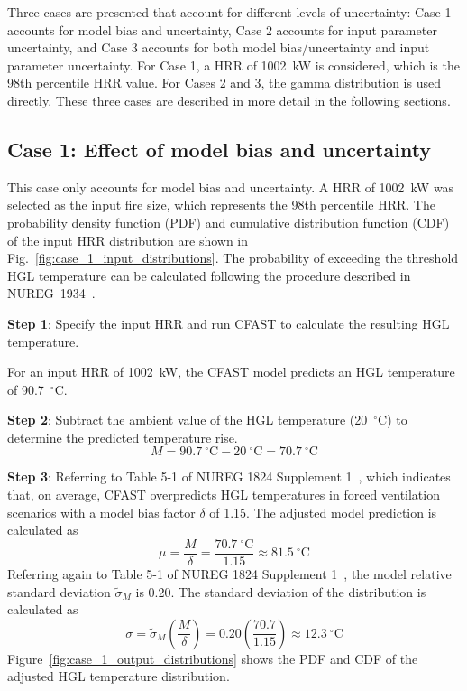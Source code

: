 \documentclass[12pt]{article}
\begin{document}
Three cases are presented that account for different levels of uncertainty: Case 1 accounts for model bias and uncertainty, Case 2 accounts for input parameter uncertainty, and Case 3 accounts for both model bias/uncertainty and input parameter uncertainty. For Case 1, a HRR of 1002~kW is considered, which is the 98th percentile HRR value. For Cases 2 and 3, the gamma distribution is used directly. These three cases are described in more detail in the following sections.



\clearpage


\subsection{Case 1: Effect of model bias and uncertainty}

This case only accounts for model bias and uncertainty. A HRR of 1002~kW was selected as the input fire size, which represents the 98th percentile HRR. The probability density function (PDF) and cumulative distribution function (CDF) of the input HRR distribution are shown in Fig.~\ref{fig:case_1_input_distributions}. The probability of exceeding the threshold HGL temperature can be calculated following the procedure described in NUREG~1934~\cite{NUREG_1934}.

\textbf{Step 1}: Specify the input HRR and run CFAST to calculate the resulting HGL temperature.

For an input HRR of 1002~kW, the CFAST model predicts an HGL temperature of 90.7~$^\circ$C.

\textbf{Step 2}: Subtract the ambient value of the HGL temperature (20~$^\circ$C) to determine the predicted temperature rise.
\begin{equation}
M = 90.7~^\circ\textrm{C} - 20~^\circ\textrm{C} = 70.7~^\circ\textrm{C}
\end{equation}

\textbf{Step 3}: Referring to Table 5-1 of NUREG 1824 Supplement 1~\cite{NUREG_1824_Sup_1}, which indicates that, on average, CFAST overpredicts HGL temperatures in forced ventilation scenarios with a model bias factor $\delta$ of 1.15. The adjusted model prediction is calculated as
\begin{equation}
\mu = \frac{M}{\delta} = \frac{70.7~^\circ\textrm{C}}{1.15} \approx 81.5~^\circ\textrm{C}
\end{equation}
Referring again to Table 5-1 of NUREG 1824 Supplement 1~\cite{NUREG_1824_Sup_1}, the model relative standard deviation $\widetilde\sigma_M$ is 0.20. The standard deviation of the distribution is calculated as
\begin{equation}
\sigma = \widetilde\sigma_M \left( \frac{M}{\delta} \right) = 0.20 \left( \frac{70.7}{1.15} \right) \approx 12.3~^\circ\textrm{C}
\end{equation}
Figure~\ref{fig:case_1_output_distributions} shows the PDF and CDF of the adjusted HGL temperature distribution.
\end{document}

